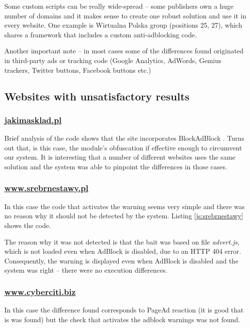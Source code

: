 Some custom scripts can be really wide-spread -- some publishers own a huge number of domains and it makes 
sense to create one robust solution and use it in every website. One example is Wirtualna Polska group (positions 25, 27), which shares
a framework that includes a custom anti-adblocking code.

Another important note -- in most cases some of the differences found originated in third-party ads
or tracking code (Google Analytics, AdWords, Gemius trackers, Twitter buttons, Facebook buttons etc.)

\subsection{Websites with unsatisfactory results}

\subsubsection{\url{jakimasklad.pl}}
Brief analysis of the code shows that the site incorporates BlockAdBlock \cite{github:blockadblock}. 
Turns out that, is this case, the module's obfuscation if effective enough to circumvent our system.
It is interesting that a number of different websites uses the same solution and the system
was able to pinpoint the differences in those cases.

\subsubsection{\url{www.srebrnestawy.pl}}
In this case the code that activates the warning seems very simple and there was no reason why
it should not be detected by the system. Listing \ref{js:srebrnestawy} shows the code.



The reason why it was not detected is that the bait was based on file \emph{advert.js}, which is not loaded 
even when AdBlock is disabled, due to an HTTP 404 error. Consequently, the warning is displayed even 
when AdBlock is disabled and the system was right -- there were no execution differences.

\subsubsection{\url{www.cyberciti.biz}}
In this case the difference found corresponds to PageAd reaction (it is good that is was found)
but the check that activates the adblock warnings was not found.

